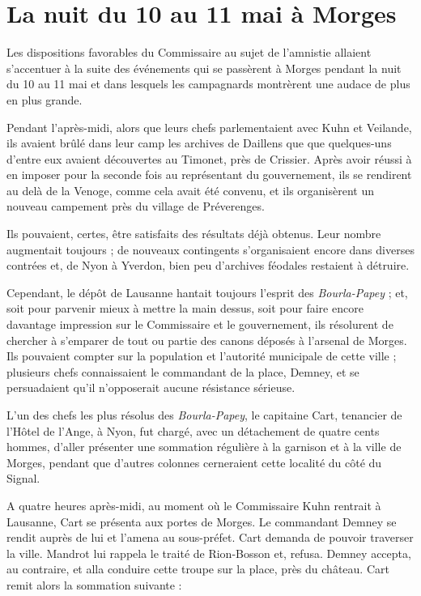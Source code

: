 \documentclass[french,twoside]{book} %
\begin{document}
\section[La nuit du 10 au 11 mai à Morges]{La nuit du 10 au 11 mai à Morges}
\noindent Les dispositions favorables du Commissaire au sujet de l’amnistie allaient s’accentuer à la suite des événements qui se passèrent à Morges pendant la nuit du 10 au 11 mai et dans lesquels les campagnards montrèrent une audace de plus en plus grande.\par
Pendant l’après-midi, alors que leurs chefs parlementaient avec Kuhn et Veilande, ils avaient brûlé dans leur camp les archives de Daillens que que quelques-uns d’entre eux avaient découvertes au Timonet, près de Crissier. Après avoir réussi à en imposer pour la seconde fois au représentant du gouvernement, ils se rendirent au delà de la Venoge, comme cela avait été convenu, et ils organisèrent un nouveau campement près du village de Préverenges.\par
Ils pouvaient, certes, être satisfaits des résultats déjà obtenus. Leur nombre augmentait toujours ; de nouveaux contingents s’organisaient encore dans diverses contrées et, de Nyon à Yverdon, bien peu d’archives féodales restaient à détruire.\par
Cependant, le dépôt de Lausanne hantait toujours l’esprit des \emph{Bourla-Papey} ; et, soit pour parvenir mieux à mettre la main dessus, soit pour faire encore davantage impression sur le Commissaire et le gouvernement, ils résolurent de chercher à s’emparer de tout ou partie des canons déposés à l’arsenal de Morges. Ils pouvaient compter sur la population et l’autorité municipale de cette ville ; plusieurs chefs connaissaient le commandant de la place, Demney, et se persuadaient qu’il n’opposerait aucune résistance sérieuse.\par
L’un des chefs les plus résolus des \emph{Bourla-Papey}, le capitaine Cart, tenancier de l’Hôtel de l’Ange, à Nyon, fut chargé, avec un détachement de quatre cents hommes, d’aller présenter une sommation régulière à la garnison et à la ville de Morges, pendant que d’autres colonnes cerneraient cette localité du côté du Signal.\par
A quatre heures après-midi, au moment où le Commissaire Kuhn rentrait à Lausanne, Cart se présenta aux portes de Morges. Le commandant Demney se rendit auprès de lui et l’amena au sous-préfet. Cart demanda de pouvoir traverser la ville. Mandrot lui rappela le traité de Rion-Bosson et, refusa. Demney accepta, au contraire, et alla conduire cette troupe sur la place, près du château. Cart remit alors la sommation suivante :\par
\end{document}
